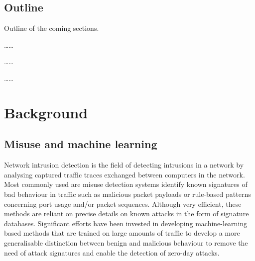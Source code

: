 \documentclass{article}
\begin{document}
\subsection{Outline}


Outline of the coming sections.

\dots \dots

\dots \dots

\dots \dots




\section{Background}

\subsection{Misuse and machine learning}


Network intrusion detection is the field of detecting intrusions in a network by analysing captured traffic traces exchanged between computers in the network. Most commonly used are misuse detection systems identify known signatures of bad behaviour in traffic such as malicious packet payloads or rule-based patterns concerning port usage and/or packet sequences. Although very efficient, these methods are reliant on precise details on known attacks in the form of signature databases. Significant efforts have been invested in developing machine-learning based methods that are trained on large amounts of traffic to develop a more generalisable distinction between benign and malicious behaviour to remove the need of attack signatures and enable the detection of zero-day attacks.
\end{document}
